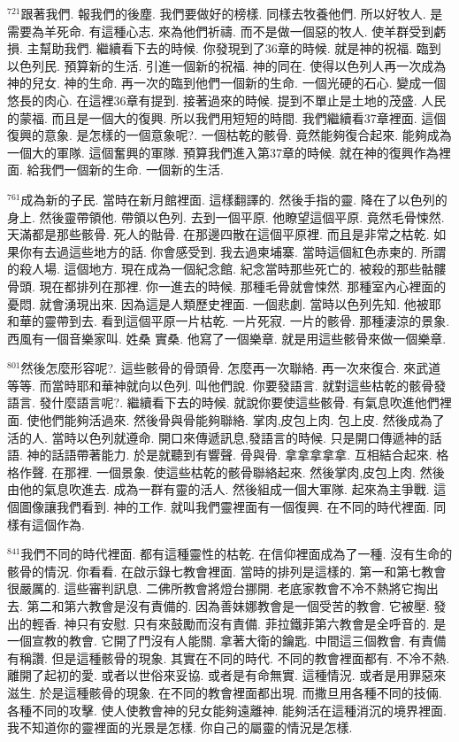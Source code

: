 \documentclass{book}
\begin{document}
$^{721}$跟著我們.
報我們的後塵.
我們要做好的榜樣.
同樣去牧養他們.
所以好牧人.
是需要為羊死命.
有這種心志.
來為他們祈禱.
而不是做一個惡的牧人.
使羊群受到虧損.
主幫助我們.
繼續看下去的時候.
你發現到了36章的時候.
就是神的祝福.
臨到以色列民.
預算新的生活.
引進一個新的祝福.
神的同在.
使得以色列人再一次成為神的兒女.
神的生命.
再一次的臨到他們一個新的生命.
一個光硬的石心.
變成一個悠長的肉心.
在這裡36章有提到.
接著過來的時候.
提到不單止是土地的茂盛.
人民的蒙福.
而且是一個大的復興.
所以我們用短短的時間.
我們繼續看37章裡面.
這個復興的意象.
是怎樣的一個意象呢?.
一個枯乾的骸骨.
竟然能夠復合起來.
能夠成為一個大的軍隊.
這個奮興的軍隊.
預算我們進入第37章的時候.
就在神的復興作為裡面.
給我們一個新的生命.
一個新的生活.

$^{761}$成為新的子民.
當時在新月館裡面.
這樣翻譯的.
然後手指的靈.
降在了以色列的身上.
然後靈帶領他.
帶領以色列.
去到一個平原.
他瞭望這個平原.
竟然毛骨悚然.
天滿都是那些骸骨.
死人的骷骨.
在那邊四散在這個平原裡.
而且是非常之枯乾.
如果你有去過這些地方的話.
你會感受到.
我去過柬埔寨.
當時這個紅色赤柬的.
所謂的殺人場.
這個地方.
現在成為一個紀念館.
紀念當時那些死亡的.
被殺的那些骷髏骨頭.
現在都排列在那裡.
你一進去的時候.
那種毛骨就會悚然.
那種室內心裡面的憂悶.
就會湧現出來.
因為這是人類歷史裡面.
一個悲劇.
當時以色列先知.
他被耶和華的靈帶到去.
看到這個平原一片枯乾.
一片死寂.
一片的骸骨.
那種淒涼的景象.
西風有一個音樂家叫.
姓桑 實桑.
他寫了一個樂章.
就是用這些骸骨來做一個樂章.

$^{801}$然後怎麼形容呢?.
這些骸骨的骨頭骨.
怎麼再一次聯絡.
再一次來復合.
來武道等等.
而當時耶和華神就向以色列.
叫他們說.
你要發語言.
就對這些枯乾的骸骨發語言.
發什麼語言呢?.
繼續看下去的時候.
就說你要使這些骸骨.
有氣息吹進他們裡面.
使他們能夠活過來.
然後骨與骨能夠聯絡.
掌肉,皮包上肉.
包上皮.
然後成為了活的人.
當時以色列就遵命.
開口來傳遞訊息,發語言的時候.
只是開口傳遞神的話語.
神的話語帶著能力.
於是就聽到有響聲.
骨與骨.
拿拿拿拿拿.
互相結合起來.
格格作聲.
在那裡.
一個景象.
使這些枯乾的骸骨聯絡起來.
然後掌肉,皮包上肉.
然後由他的氣息吹進去.
成為一群有靈的活人.
然後組成一個大軍隊.
起來為主爭戰.
這個圖像讓我們看到.
神的工作.
就叫我們靈裡面有一個復興.
在不同的時代裡面.
同樣有這個作為.

$^{841}$我們不同的時代裡面.
都有這種靈性的枯乾.
在信仰裡面成為了一種.
沒有生命的骸骨的情況.
你看看.
在啟示錄七教會裡面.
當時的排列是這樣的.
第一和第七教會很嚴厲的.
這些審判訊息.
二佛所教會將燈台挪開.
老底家教會不冷不熱將它掏出去.
第二和第六教會是沒有責備的.
因為善妹娜教會是一個受苦的教會.
它被壓.
發出的輕香.
神只有安慰.
只有來鼓勵而沒有責備.
菲拉鐵菲第六教會是全呼音的.
是一個宣教的教會.
它開了門沒有人能關.
拿著大衛的鑰匙.
中間這三個教會.
有責備有稱讚.
但是這種骸骨的現象.
其實在不同的時代.
不同的教會裡面都有.
不冷不熱.
離開了起初的愛.
或者以世俗來妥協.
或者是有命無實.
這種情況.
或者是用罪惡來滋生.
於是這種骸骨的現象.
在不同的教會裡面都出現.
而撒旦用各種不同的技倆.
各種不同的攻擊.
使人使教會神的兒女能夠遠離神.
能夠活在這種消沉的境界裡面.
我不知道你的靈裡面的光景是怎樣.
你自己的屬靈的情況是怎樣.
\end{document}
